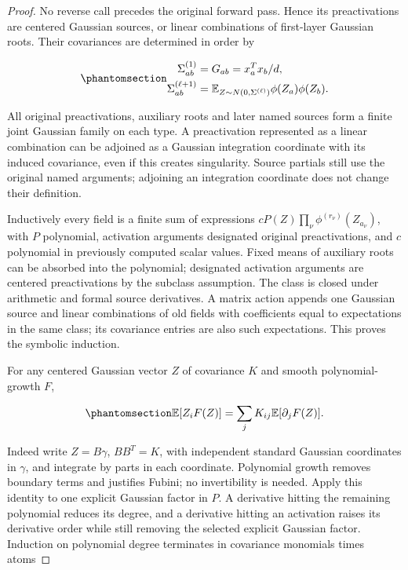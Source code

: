 \documentclass[
  11pt,
]{article}
\theoremstyle{definition}
\theoremstyle{plain}
\theoremstyle{plain}
\theoremstyle{plain}
\theoremstyle{remark}
\begin{document}
\protect{}\label{proof-mfp-initialization-normal-form}{}

\begin{proof}
No reverse call precedes the original forward pass. Hence its
preactivations are centered Gaussian sources, or linear combinations of
first-layer Gaussian roots. Their covariances are determined in order by

\begin{equation}\protect\phantomsection\label{eq-mfp-forward-covariances}{
\begin{aligned}
\Sigma^{(1)}_{ab}&=G_{ab}=x_a^Tx_b/d,\\
\Sigma^{(\ell+1)}_{ab}
&=\mathbb E_{Z\sim N(0,\Sigma^{(\ell)})}\phi(Z_a)\phi(Z_b).
\end{aligned}
}\end{equation}

All original preactivations, auxiliary roots and later named sources
form a finite joint Gaussian family on each type. A preactivation
represented as a linear combination can be adjoined as a Gaussian
integration coordinate with its induced covariance, even if this creates
singularity. Source partials still use the original named arguments;
adjoining an integration coordinate does not change their definition.

Inductively every field is a finite sum of expressions
\(cP(Z)\prod_\nu\phi^{(r_\nu)}(Z_{a_\nu})\), with \(P\) polynomial,
activation arguments designated original preactivations, and \(c\)
polynomial in previously computed scalar values. Fixed means of
auxiliary roots can be absorbed into the polynomial; designated
activation arguments are centered preactivations by the subclass
assumption. The class is closed under arithmetic and formal source
derivatives. A matrix action appends one Gaussian source and linear
combinations of old fields with coefficients equal to expectations in
the same class; its covariance entries are also such expectations. This
proves the symbolic induction.

For any centered Gaussian vector \(Z\) of covariance \(K\) and smooth
polynomial-growth \(F\),

\begin{equation}\protect\phantomsection\label{eq-mfp-stein-reduction}{
\mathbb E[Z_iF(Z)]=\sum_jK_{ij}\mathbb E[\partial_jF(Z)].
}\end{equation}

Indeed write \(Z=B\gamma\), \(BB^T=K\), with independent standard
Gaussian coordinates in \(\gamma\), and integrate by parts in each
coordinate. Polynomial growth removes boundary terms and justifies
Fubini; no invertibility is needed. Apply this identity to one explicit
Gaussian factor in \(P\). A derivative hitting the remaining polynomial
reduces its degree, and a derivative hitting an activation raises its
derivative order while still removing the selected explicit Gaussian
factor. Induction on polynomial degree terminates in covariance
monomials times atoms


\end{proof}
\end{document}
